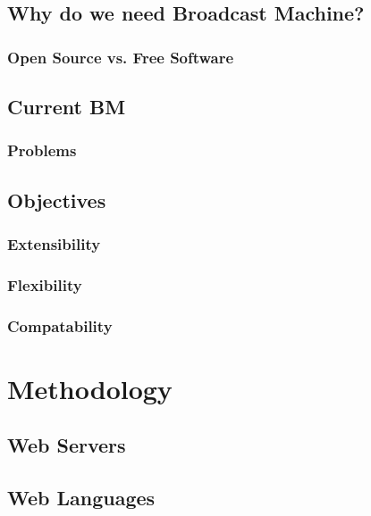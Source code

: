 \documentclass[a4paper,12pt]{report}
\begin{document}
\section{Why do we need Broadcast Machine?}

\subsection*{Open Source vs. Free Software}

\section{Current BM}

\subsection*{Problems}

\section{Objectives}

\subsection*{Extensibility}

\subsection*{Flexibility}

\subsection*{Compatability}

\chapter{Methodology}

\section{Web Servers}

\section{Web Languages}
\end{document}
